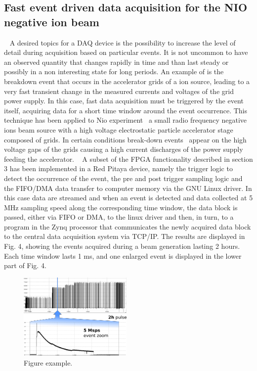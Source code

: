 \subsection{Fast event driven data acquisition for the NIO negative ion beam}
\label{section:NIO1}
~
A desired topics for a DAQ device is the possibility to increase the level of detail during acquisition based on particular events. It is not uncommon to have an observed quantity that changes rapidly in time and than last steady or possibly in a non interesting state for long periods. An example of is the breakdown event that occurs in the accelerator grids of a ion source, leading to a very fast transient change in the measured currents and voltages of the grid power supply. In this case, fast data acquisition must be triggered by the event itself, acquiring data for a short time window around the event occurrence. This technique has been applied to Nio experiment~\cite{DEMURI2015249} a small radio frequency negative ions beam source with a high voltage electrostatic particle accelerator stage composed of grids. In certain conditions break-down events~\cite{RECCHIA20111545} appear on the high voltage gaps of the grids causing a  high current discharges of the power supply feeding the accelerator. 
~
A subset of the FPGA functionality described in section 3 has been implemented in a Red Pitaya device, namely the trigger logic to detect the occurrence of the event, the pre and post trigger sampling logic and the FIFO/DMA data transfer to computer memory via the GNU Linux driver. In this case data are streamed and when an event is detected and data collected at 5 MHz sampling speed along the corresponding time window, the data block is passed, either via FIFO or DMA, to the linux driver and then, in turn, to a program in the Zynq processor that communicates the newly acquired data block to the central data acquisition system via TCP/IP. The results are displayed in Fig. 4, showing the events acquired during a beam generation lasting 2 hours. Each time window lasts 1 ms, and one enlarged event is  displayed in the lower part of Fig. 4.    
\begin{figure}
\centering
\includegraphics[width=0.49\textwidth]{img/4_EmbeddedML/nio12b.png}
\caption{Figure example.}
\label{fig:nio}
\end{figure}


